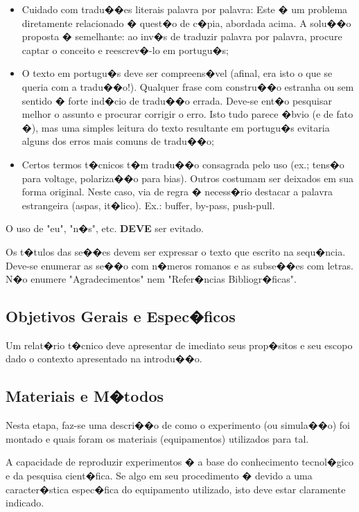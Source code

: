 \documentclass[conference]{IEEEtran}
\begin{document}
\begin{itemize}
\item Cuidado com tradu��es literais palavra por palavra: Este � um problema diretamente relacionado � quest�o de c�pia, abordada acima. A solu��o proposta � semelhante: ao inv�s de traduzir palavra por palavra, procure captar o conceito e reescrev�-lo em portugu�s;
\item O texto em portugu�s deve ser compreens�vel (afinal, era isto o que se queria com a tradu��o!). Qualquer frase com constru��o estranha ou sem sentido � forte ind�cio de tradu��o errada. Deve-se ent�o pesquisar melhor o assunto e procurar corrigir o erro. Isto tudo parece �bvio (e de fato �), mas uma simples leitura do texto resultante em portugu�s evitaria alguns dos erros mais comuns de tradu��o;
\item Certos termos t�cnicos t�m tradu��o consagrada pelo uso (ex.; tens�o para voltage, polariza��o para bias). Outros costumam ser deixados em sua forma original. Neste caso, via de regra � necess�rio destacar a palavra estrangeira (aspas, it�lico). Ex.: buffer, by-pass, push-pull. 
\end{itemize}

O uso de "eu", "n�s", etc. \textbf{DEVE} ser evitado.

Os t�tulos das se��es devem ser expressar o texto que escrito na sequ�ncia. Deve-se enumerar as se��o com n�meros romanos e as subse��es com letras. N�o enumere "Agradecimentos" nem "Refer�ncias Bibliogr�ficas".

\subsection{Objetivos Gerais e Espec�ficos}

Um relat�rio t�cnico deve apresentar de imediato seus prop�sitos e seu escopo dado o contexto apresentado na introdu��o.

\subsection{Materiais e M�todos}
Nesta etapa, faz-se uma descri��o de como o experimento (ou simula��o) foi montado e quais foram os materiais (equipamentos) utilizados para tal.

A capacidade de reproduzir experimentos � a base do conhecimento tecnol�gico e da pesquisa cient�fica. Se algo em seu procedimento � devido a uma caracter�stica espec�fica do equipamento utilizado, isto deve estar claramente indicado.
\end{document}
